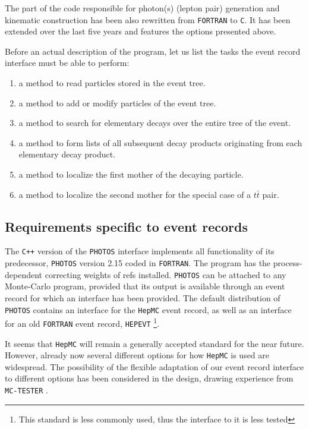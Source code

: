 \documentclass[]{Photos_interface_design}
\begin{document}
The part of the code responsible for photon(s) (lepton pair) 
generation and kinematic 
construction has been also rewritten from {\tt FORTRAN} to {\tt C}. It has been extended
over the last five years and features the options presented above.


Before an actual description of the program, let us list the tasks the event record interface must be able to perform:
\begin{enumerate}
\item a method to read  particles stored in the event tree.
\item a method to add or modify particles of the event tree.
\item a method to search for elementary decays over the entire tree of the event.
\item a method to form lists of all subsequent decay products originating from each elementary decay product.
\item a method to localize the first mother of the decaying particle. 
\item a method to localize the second mother for the special case of a $t \bar t$ pair.
\end{enumerate}


\subsection{ Requirements specific to event records}

The {\tt C++} version of the {\tt PHOTOS} interface implements all functionality
of its predecessor, {\tt PHOTOS} version 2.15 \cite{Golonka:2005pn} coded in {\tt FORTRAN}.
The program has the process-dependent correcting weights of refs 
\cite{Golonka:2006tw,Nanava:2009vg} installed.
{\tt PHOTOS} can be attached to any Monte-Carlo program,
provided that its output is available through an event record for which an interface has been provided.
The default distribution of {\tt PHOTOS} contains an interface for the {\tt HepMC} \cite{Dobbs:2001ck} event record,
as well as an interface for an old {\tt FORTRAN} event record, {\tt HEPEVT}%
\footnote{This standard is less commonly used, thus the interface to it is less tested}.

It seems that {\tt HepMC} will
remain a generally accepted standard for the near future. However,
already now several different options for how {\tt HepMC} is used are
widespread. The possibility of the flexible  adaptation of our event record 
interface to different
options has been considered in the design,  drawing experience
from {\tt MC-TESTER} \cite{Davidson:2008ma,Golonka:2002rz}.
\end{document}
